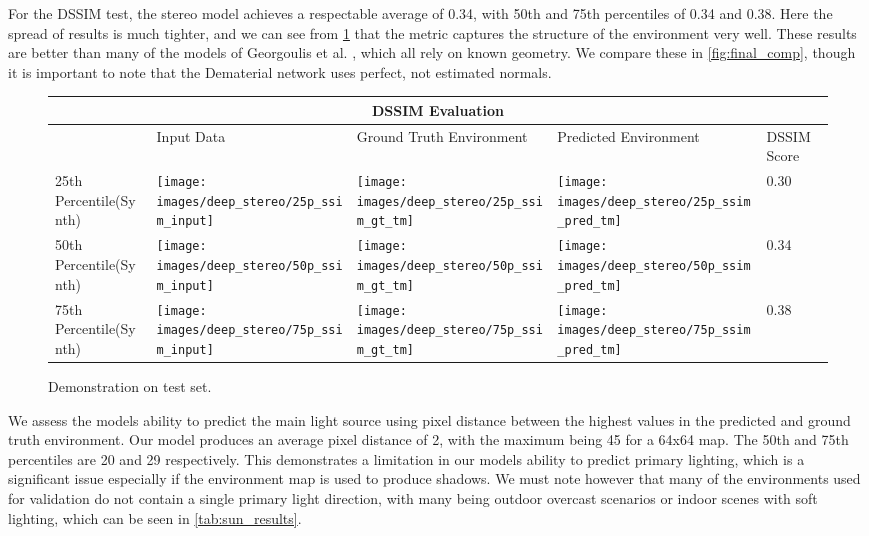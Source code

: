 \documentclass[ %
                    author={Gavin Parker},
                supervisor={Dr. Neill Campbell},
                    degree={MEng},
                     title={Deep Learning for Illumination Estimation from Stereo Images},
                  subtitle={},
                      type={Research},
                      year={2018} ]{dissertation}
\begin{document}
For the DSSIM test, the stereo model achieves a respectable average of 0.34, with 50th and 75th percentiles of 0.34 and 0.38. Here the spread of results is much tighter, and we can see from \ref{tab:ssim_results} that the metric captures the structure of the environment very well. These results are better than many of the models of Georgoulis et al. \cite{Georgoulis_2017_ICCV}, which all rely on known geometry. We compare these in \ref{fig:final_comp}, though it is important to note that the Dematerial network uses perfect, not estimated normals.
 \newline
 \begin{figure}[H]
\centering
\begin{tabular}{ |p{3cm}||p{3cm}|p{3cm}|p{3cm}|p{3cm}|  }
 \hline
 \multicolumn{5}{|c|}{DSSIM Evaluation} \\
 \hline
  & Input Data &Ground Truth Environment&Predicted Environment&DSSIM Score\\
 \hline
 25th Percentile(Synth)&\parbox[c]{1em}{
 \texttt{[image: images/deep\_stereo/25p\_ssim\_input]}}&\parbox[c]{1em}{\texttt{[image: images/deep\_stereo/25p\_ssim\_gt\_tm]}}&
\parbox[c]{1em}{\texttt{[image: images/deep\_stereo/25p\_ssim\_pred\_tm]}}& 0.30\\
 50th Percentile(Synth)&\parbox[c]{1em}{
 \texttt{[image: images/deep\_stereo/50p\_ssim\_input]}}&\parbox[c]{1em}{\texttt{[image: images/deep\_stereo/50p\_ssim\_gt\_tm]}}&
\parbox[c]{1em}{\texttt{[image: images/deep\_stereo/50p\_ssim\_pred\_tm]}}& 0.34\\
 75th Percentile(Synth)&\parbox[c]{1em}{
 \texttt{[image: images/deep\_stereo/75p\_ssim\_input]}}&\parbox[c]{1em}{\texttt{[image: images/deep\_stereo/75p\_ssim\_gt\_tm]}}&
\parbox[c]{1em}{\texttt{[image: images/deep\_stereo/75p\_ssim\_pred\_tm]}}& 0.38\\

 \hline
\end{tabular}

\caption{Demonstration on test set.}
\label{tab:ssim_results}

\end{figure}
 We assess the models ability to predict the main light source using pixel distance between the highest values in the predicted and ground truth environment. Our model produces an average pixel distance of 2, with the maximum being 45 for a 64x64 map. The 50th and 75th percentiles are 20 and 29 respectively. This demonstrates a limitation in our models ability to predict primary lighting, which is a significant issue especially if the environment map is used to produce shadows. We must note however that many of the environments used for validation do not contain a single primary light direction, with many being outdoor overcast scenarios or indoor scenes with soft lighting, which can be seen in \ref{tab:sun_results}.
\end{document}

